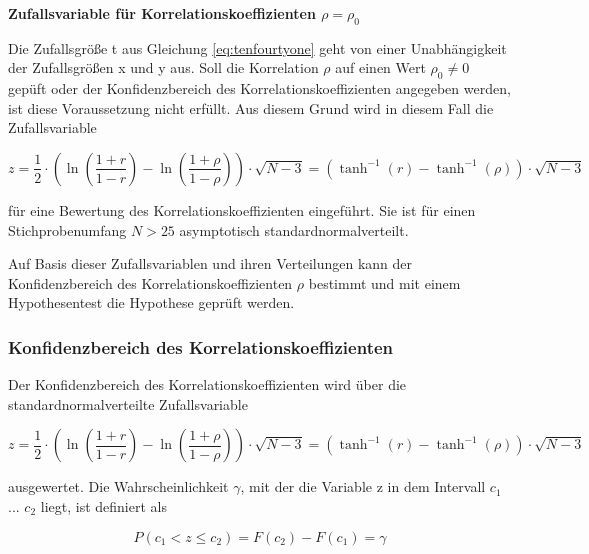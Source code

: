 {\selectfont
\noindent\textbf{Zufallsvariable f\"{u}r Korrelationskoeffizienten $\rho = \rho_{0}$}}\smallskip

\noindent Die Zufallsgr\"{o}{\ss}e t aus Gleichung \eqref{eq:tenfourtyone} geht von einer Unabh\"{a}ngigkeit der Zufallsgr\"{o}{\ss}en x und y aus. Soll die Korrelation $\rho$ auf einen Wert $\rho_{0} \neq 0$ gep\"{u}ft oder der Konfidenzbereich des Korrelationskoeffizienten angegeben werden, ist diese Voraussetzung nicht erf\"{u}llt. Aus diesem Grund wird in diesem Fall die Zufallsvariable 

\begin{equation}\label{eq:tenfourtytwo}
z=\dfrac{1}{2} \cdot \left(\ln \left(\dfrac{1+r}{1-r} \right)-\ln \left(\dfrac{1+\rho}{1-\rho} \right)\right)\cdot \sqrt{N-3} =\left(\tanh ^{-1} (r)-\tanh ^{-1} (\rho)\right)\cdot \sqrt{N-3} 
\end{equation}

\noindent f\"{u}r eine Bewertung des Korrelationskoeffizienten eingef\"{u}hrt. Sie ist f\"{u}r einen Stichprobenumfang $N > 25$ asymptotisch standardnormalverteilt.\newline

\noindent Auf Basis dieser Zufallsvariablen und ihren Verteilungen kann der Konfidenzbereich des Korrelationskoeffizienten $\rho$ bestimmt und mit einem Hypothesentest die Hypothese gepr\"{u}ft werden.


\subsubsection{Konfidenzbereich des Korrelationskoeffizienten}

\noindent Der Konfidenzbereich des Korrelationskoeffizienten wird \"{u}ber die standardnormalverteilte Zufallsvariable 

\begin{equation}\label{eq:tenfourtythree}
z=\dfrac{1}{2} \cdot \left(\ln \left(\dfrac{1+r}{1-r} \right)-\ln \left(\dfrac{1+\rho}{1-\rho} \right)\right)\cdot \sqrt{N-3} =\left(\tanh ^{-1} (r)-\tanh ^{-1} (\rho)\right)\cdot \sqrt{N-3}
\end{equation}

\noindent ausgewertet. Die Wahrscheinlichkeit $\gamma$, mit der die Variable z in dem Intervall $c_{1}$ ... $c_{2}$ liegt, ist definiert als

\begin{equation}\label{eq:tenfourtyfour}
P(c_{1} <z\le c_{2})=F(c_{2})-F(c_{1})=\gamma
\end{equation}

